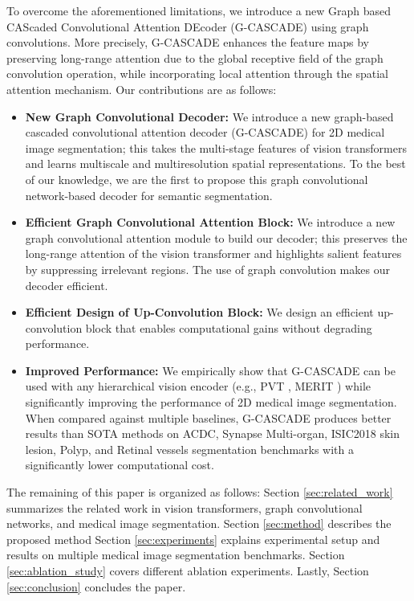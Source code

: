 \documentclass[10pt,twocolumn,letterpaper]{article}
\begin{document}
To overcome the aforementioned limitations, we introduce a new Graph based CAScaded  Convolutional Attention DEcoder (G-CASCADE) using graph convolutions. More precisely, G-CASCADE enhances the feature maps by preserving long-range attention due to the global receptive field of the graph convolution operation, while incorporating local attention through the spatial attention mechanism. Our contributions are as follows:
\begin{itemize}
  \item \textbf{New Graph Convolutional Decoder:} We introduce a new graph-based cascaded convolutional attention decoder (G-CASCADE) for 2D medical image segmentation; this takes the multi-stage features of vision transformers and learns multiscale and multiresolution spatial representations. To the best of our knowledge, we are the first to propose this graph convolutional network-based decoder for semantic segmentation.
\item \textbf{Efficient Graph Convolutional Attention Block:} We introduce a new graph convolutional attention module to build our decoder; this preserves the long-range attention of the vision transformer and highlights salient features by suppressing irrelevant regions. The use of graph convolution makes our decoder efficient. 
\item \textbf{Efficient Design of Up-Convolution Block:} We design an efficient up-convolution block that enables computational gains without degrading performance.
\item \textbf{Improved Performance:} We empirically show that G-CASCADE can be used with any hierarchical vision encoder (e.g., PVT \cite{wang2022pvt}, MERIT \cite{chen2021transunet}) while significantly improving the performance of 2D medical image segmentation. When compared against multiple baselines, G-CASCADE produces better results than SOTA methods on ACDC, Synapse Multi-organ, ISIC2018 skin lesion, Polyp, \color{black}and Retinal vessels segmentation \color{black}benchmarks with a significantly lower computational cost.
\end{itemize}

The remaining of this paper is organized as follows: Section \ref{sec:related_work} summarizes the related work in vision transformers, graph convolutional networks, and medical image segmentation. Section \ref{sec:method} describes the proposed method Section \ref{sec:experiments} explains experimental setup and results on multiple medical image segmentation benchmarks. Section \ref{sec:ablation_study} covers different ablation experiments. Lastly, Section \ref{sec:conclusion} concludes the paper. 
\end{document}
